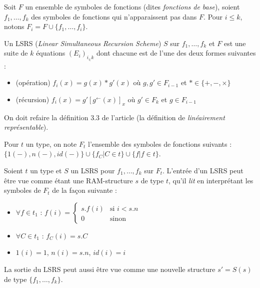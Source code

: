 \documentclass{report}
\newcommand{\eqpred}[3]{#1\left[ #2^{\leftarrow}(#3) \right]_{#3}}
\begin{document}
		
		\begin{definition}[LSRS]
			\label{def:LSRS}
			Soit $F$ un ensemble de symboles de fonctions (dites \emph{fonctions de base}), soient $f_1, \dots, f_k$ des symboles de fonctions qui n'apparaissent pas dans $F$. Pour $i\leqslant k$, notons $F_i = F\cup \{f_1, \dots, f_i\}$. 
		
		Un LSRS (\emph{Linear Simultaneous Recursion Scheme}) $S$ sur $f_1, \dots, f_k$ et $F$ est une suite de $k$ équations $\left(E_i\right)_{i_\in k}$ dont chacune est de l'une des deux formes suivantes :
		
		\begin{itemize}
			\item 	(opération) 		$f_i(x) = g(x) * g'(x)$ où $g,g' \in F_{i-1}$ et $* \in \{+, -, \times \}$\footnotemark
			
			
			\item 	(récursion)			$f_i(x) = \eqpred{g'}{g}{x}$ où $g' \in F_k$ et $g \in F_{i-1}$
		\end{itemize}
		
		\end{definition}
		
		
		On doit refaire la définition 3.3 de l'article (la définition de \emph{linéairement représentable}).
		
		Pour $t$ un type, on note $F_t$ l'ensemble des symboles de fonctions suivants : $\{1(-), n(-), id(-)\} \cup  \{ f_C | C \in t\} \cup \{ f | f \in t\}$.
		
		\begin{remark}
			\label{rk:entree_LSRS}
			Soient $t$ un type et $S$ un LSRS pour $f_1, \dots, f_k$ sur $F_{t}$. 
			L'entrée d'un LSRS peut être vue comme étant une RAM-structure $s$ de type $t$, qu'il \emph{lit} en interprétant les symboles de $F_t$ de la façon suivante : 
			
			\begin{itemize}[itemsep=-1mm]
				\item 	$\forall f \in t_1$ :   $f(i) = 
				\left\lbrace \begin{array}{ll}
				s.f(i) & \text{si } i< s.n \\
				0 & \text{sinon}
				\end{array}\right.$
				
				\item 	$\forall C \in t_1$ :   $f_C(i) = s.C$
				\item 	$1(i) = 1$, $n(i) = s.n$, $id(i) = i$
			\end{itemize}
			
			La sortie du LSRS peut aussi être vue comme une nouvelle structure $s' = S(s)$ de type $\{f_1, \dots, f_k\}$.
		\end{remark}
		
\end{document}
